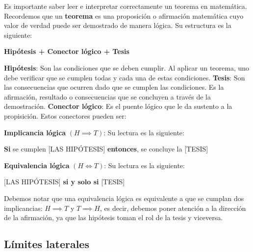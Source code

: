 \begin{notation}{}{}
  Es importante saber leer e interpretar correctamente un teorema en matemática. Recordemos que un \textbf{teorema} es una proposición o afirmación matemática cuyo valor de verdad puede ser demostrado de manera lógica. Su estructura es la siguiente:
  \begin{center}
    \textbf{Hipótesis + Conector lógico + Tesis}
  \end{center}
  \begin{itemize}
    \ii \textbf{Hipótesis}: Son las condiciones que se deben cumplir. Al aplicar un teorema, uno debe verificar que se cumplen todas y cada una de estas condiciones.
    \ii \textbf{Tesis}: Son las consecuencias que ocurren dado que se cumplen las condiciones. Es la afirmación, resultado o consecuencias que se concluyen a través de la demostración.
    \ii \textbf{Conector lógico}: Es el puente lógico que le da sustento a la propisición. Estos conectores pueden ser: 
    \begin{itemize}
      \ii \textbf{Implicancia lógica} $(H \implies T)$: Su lectura es la siguiente:
      \begin{center}
        \textbf{Si} se cumplen [LAS HIPÓTESIS] \textbf{entonces}, se concluye la [TESIS]    
      \end{center}
      \ii \textbf{Equivalencia lógica} $(H \iff T)$: Su lectura es la siguiente:
      \begin{center}
        [LAS HIPÓTESIS] \textbf{si y solo si} [TESIS]
      \end{center}
      Debemos notar que una equivalencia lógica es equivalente a que se cumplan dos implicancias: $H \implies T$ y $T \implies H$, es decir, debemos poner atención a la dirección de la afirmación, ya que las hipótesis toman el rol de la tesis y viceversa.
    \end{itemize}
  \end{itemize}
\end{notation}

\subsection{Límites laterales}

